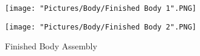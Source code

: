\documentclass[12pt]{article}
\begin{document}
\begin{enumerate}
\begin{figure}[H]
  \centering
  \begin{minipage}[b]{0.45\textwidth}
    \texttt{[image: "Pictures/Body/Finished Body 1".PNG]}
  \end{minipage}
  \hfill
  \begin{minipage}[b]{0.45\textwidth}
    \texttt{[image: "Pictures/Body/Finished Body 2".PNG]}
  \end{minipage}
  \caption{Finished Body Assembly}
  \label{finished body}
\end{figure}

\end{enumerate}
\end{document}
